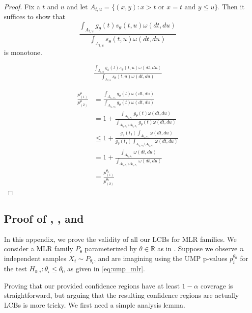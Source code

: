 \documentclass{article}
\newcommand{\R}{\mathbb{R}}
\begin{document}
\begin{appendix}
\begin{proof}
        Fix a $t$ and $u$ and let $A_{t, u} = \{(x, y) : x > t \text{ or } x = t \text{ and } y \leq u \}$. Then it suffices to show that 
        \begin{equation*}
            \frac{ \int_{A_{t, u}}  g_{\theta}(t) s_{\theta}(t, u) \omega(dt, du)}{ \int_{A_{t, u}} s_{\theta}(t, u) \omega(dt, du)}
        \end{equation*}
        is monotone. 

        \begin{align*}
            \frac{ \int_{A_{t, u}}  g_{\theta}(t) s_{\theta}(t, u) \omega(dt, du)}{ \int_{A_{t, u}} s_{\theta}(t, u) \omega(dt, du)}
        \end{align*}

        \begin{align*}
            \frac{p^{\theta}_{(1)}}{p^{\theta}_{(2)}} &= \frac{ \int_{A_{t_1, u_1}}  g_{\theta}(t) \omega(dt, du)}{ \int_{A_{t_2, u_2}} g_{\theta}(t) \omega(dt, du)} \\
            &= 1 + \frac{ \int_{A_{t_1, u_1}}  g_{\theta}(t) \omega(dt, du)}{ \int_{A_{t_2, u_2} \setminus A_{t_1, u_1}} g_{\theta}(t) \omega(dt, du)} \\
            &\leq 1 + \frac{ g_{\theta}(t_1) \int_{A_{t_1, u_1}}   \omega(dt, du)}{ g_{\theta}(t_1)\int_{A_{t_2, u_2} \setminus A_{t_1, u_1}}  \omega(dt, du)} \\
            &= 1 + \frac{ \int_{A_{t_1, u_1}}   \omega(dt, du)}{ \int_{A_{t_2, u_2} \setminus A_{t_1, u_1}}  \omega(dt, du)} \\
            &=  \frac{p^{\theta_0}_{(1)}}{p^{\theta_0}_{(2)}}
        \end{align*}
    
\end{proof}


\subsection{Proof of , , and }

In this appendix, we prove the validity of all our LCBs for MLR families. We consider a MLR family  $P_{\theta}$ parameterized by $\theta \in \R$ as in . Suppose we observe $n$ independent samples $X_i \sim P_{\theta_i}$, and are imagining using the UMP p-values $p_i^{\theta_0}$ for the test $H_{0, i} : \theta_i \leq \theta_0$ as given in \eqref{eq:ump_mlr}.

Proving that our provided confidence regions have at least $1-\alpha$ coverage is straightforward, but arguing that the resulting confidence regions are actually LCBs is more tricky. We first need a simple analysis lemma. 


\end{appendix}
\end{document}
